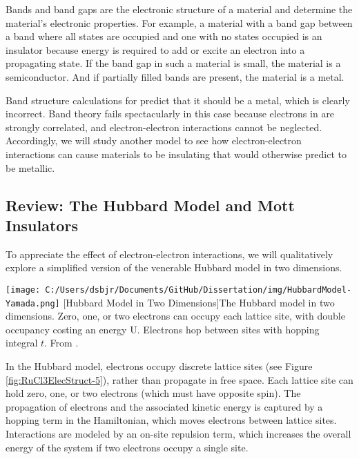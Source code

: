 Bands and band gaps are the electronic structure of a material and determine the material's electronic properties. For example, a material with a band gap between a band where all states are occupied and one with no states occupied is an insulator because energy is required to add or excite an electron into a propagating state. If the band gap in such a material is small, the material is a semiconductor. And if partially filled bands are present, the material is a metal.

Band structure calculations for \rucl predict that it should be a metal, which is clearly incorrect. Band theory fails spectacularly in this case because electrons in \rucl are strongly correlated, and electron-electron interactions cannot be neglected. Accordingly, we will study another model to see how electron-electron interactions can cause materials to be insulating that would otherwise predict to be metallic.

\subsection{Review: The Hubbard Model and Mott Insulators}

To appreciate the effect of electron-electron interactions, we will qualitatively explore a simplified version of the venerable Hubbard model in two dimensions.

\begin{centering}
\texttt{[image: C:/Users/dsbjr/Documents/GitHub/Dissertation/img/HubbardModel-Yamada.png]}
  \captionsetup{width=0.5\textwidth}
  [Hubbard Model in Two Dimensions]{The Hubbard model in two dimensions. Zero, one, or two electrons can occupy each lattice site, with double occupancy costing an energy U. Electrons hop between sites with hopping integral $t$. From \cite{Yamada2018}.}
  \label{fig:RuCl3ElecStruct-5}
\end{centering}

In the Hubbard model, electrons occupy discrete lattice sites (see Figure \ref{fig:RuCl3ElecStruct-5}), rather than propagate in free space. Each lattice site can hold zero, one, or two electrons (which must have opposite spin). The propagation of electrons and the associated kinetic energy is captured by a hopping term in the Hamiltonian, which moves electrons between lattice sites. Interactions are modeled by an on-site repulsion term, which increases the overall energy of the system if two electrons occupy a single site.

